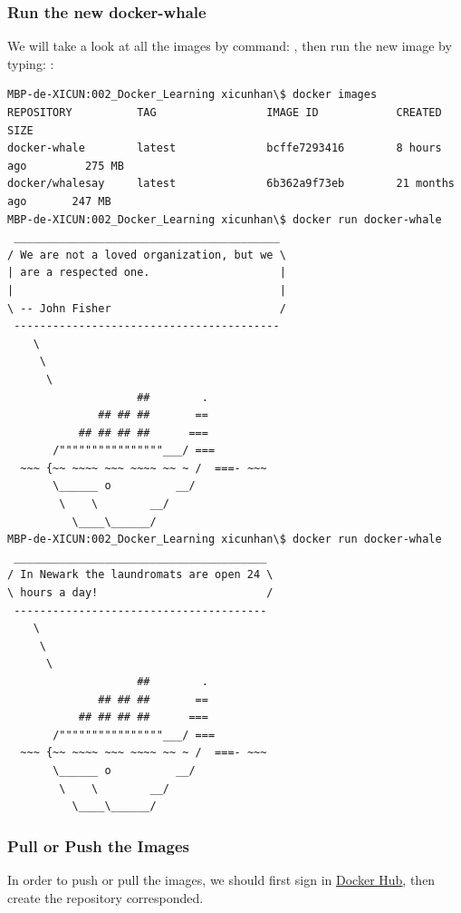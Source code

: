 \documentclass[12pt,a4paper]{article}
\begin{document}
\subsubsection{Run the new docker-whale}

We will take a look at all the images by command: \textit{{\color{violet}{docker images}}}, then run the new image by typing: \textit{{\color{violet}{docker run docker-whale}}}: \\

\begin{verbatim}
MBP-de-XICUN:002_Docker_Learning xicunhan\$ docker images
REPOSITORY          TAG                 IMAGE ID            CREATED             SIZE
docker-whale        latest              bcffe7293416        8 hours ago         275 MB
docker/whalesay     latest              6b362a9f73eb        21 months ago       247 MB
MBP-de-XICUN:002_Docker_Learning xicunhan\$ docker run docker-whale
 _________________________________________
/ We are not a loved organization, but we \
| are a respected one.                    |
|                                         |
\ -- John Fisher                          /
 -----------------------------------------
    \
     \
      \
                    ##        .
              ## ## ##       ==
           ## ## ## ##      ===
       /""""""""""""""""___/ ===
  ~~~ {~~ ~~~~ ~~~ ~~~~ ~~ ~ /  ===- ~~~
       \______ o          __/
        \    \        __/
          \____\______/
MBP-de-XICUN:002_Docker_Learning xicunhan\$ docker run docker-whale
 _______________________________________
/ In Newark the laundromats are open 24 \
\ hours a day!                          /
 ---------------------------------------
    \
     \
      \
                    ##        .
              ## ## ##       ==
           ## ## ## ##      ===
       /""""""""""""""""___/ ===
  ~~~ {~~ ~~~~ ~~~ ~~~~ ~~ ~ /  ===- ~~~
       \______ o          __/
        \    \        __/
          \____\______/

\end{verbatim}
\FloatBarrier



\subsubsection{Pull or Push the Images}

In order to push or pull the images, we should first sign in \href{https://hub.docker.com}{\underline{Docker Hub}}, then create the repository corresponded.\\
\end{document}
